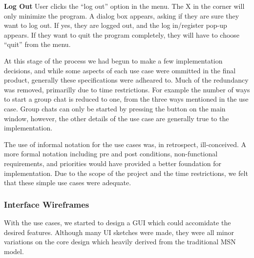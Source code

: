{\bf Log Out}
User clicks the “log out” option in the menu. The X in the corner will only minimize the program. A dialog box appears, asking if they are sure they want to log out. If yes, they are logged out, and the log in/register pop-up appears. If they want to quit the program completely, they will have to choose “quit” from the menu.

At this stage of the process we had begun to make a few implementation decisions, and while some aspects of each use case were ommitted in the final product, generally these specifications were adheared to. Much of the redundancy was removed, primarilly due to time restrictions. For example the number of ways to start a group chat is reduced to one, from the three ways mentioned in the use case. Group chats can only be started by pressing the button on the main window, however, the other details of the use case are generally true to the implementation.

The use of informal notation for the use cases was, in retrospect, ill-conceived. A more formal notation including pre and post conditions, non-functional requirements, and priorities would have provided a better foundation for implementation. Due to the scope of the project and the time restrictions, we felt that these simple use cases were adequate.

\subsubsection{Interface Wireframes}

With the use cases, we started to design a GUI which could accomidate the desired features. Although many UI sketches were made, they were all minor variations on the core design which heavily derived from the traditional MSN model.


